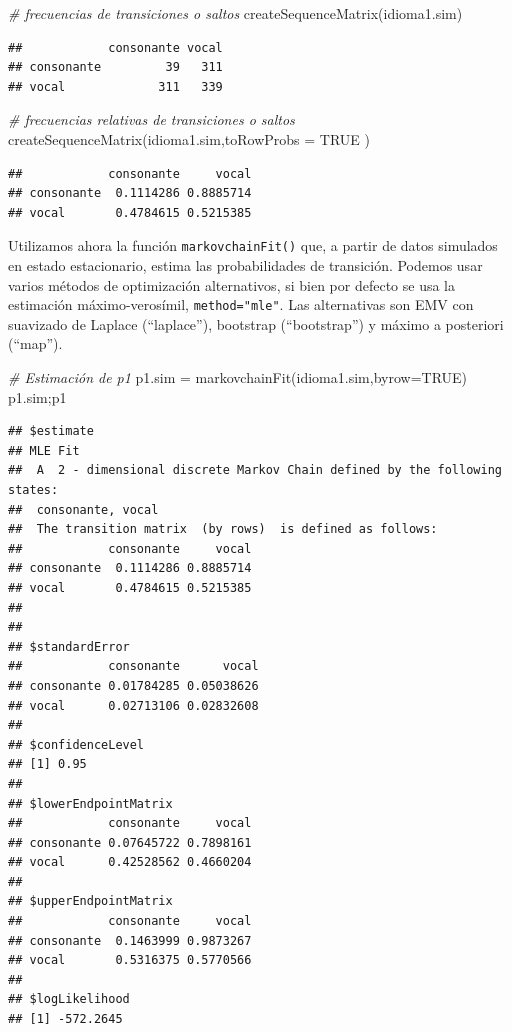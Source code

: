\documentclass[
]{book}
\newenvironment{Shaded}{\begin{snugshade}}{\end{snugshade}}
\newcommand{\AttributeTok}[1]{\textcolor[rgb]{0.77,0.63,0.00}{#1}}
\newcommand{\CommentTok}[1]{\textcolor[rgb]{0.56,0.35,0.01}{\textit{#1}}}
\newcommand{\ConstantTok}[1]{\textcolor[rgb]{0.00,0.00,0.00}{#1}}
\newcommand{\FunctionTok}[1]{\textcolor[rgb]{0.00,0.00,0.00}{#1}}
\newcommand{\NormalTok}[1]{#1}
\newcommand{\OtherTok}[1]{\textcolor[rgb]{0.56,0.35,0.01}{#1}}
\theoremstyle{definition}
\theoremstyle{definition}
\theoremstyle{definition}
\theoremstyle{definition}
\theoremstyle{remark}
\begin{document}
\begin{Shaded}
\begin{Highlighting}[]
\CommentTok{\# frecuencias de transiciones o saltos}
\FunctionTok{createSequenceMatrix}\NormalTok{(idioma1.sim)}
\end{Highlighting}
\end{Shaded}

\begin{verbatim}
##            consonante vocal
## consonante         39   311
## vocal             311   339
\end{verbatim}

\begin{Shaded}
\begin{Highlighting}[]
\CommentTok{\# frecuencias relativas de transiciones o saltos}
\FunctionTok{createSequenceMatrix}\NormalTok{(idioma1.sim,}\AttributeTok{toRowProbs =} \ConstantTok{TRUE}\NormalTok{ )}
\end{Highlighting}
\end{Shaded}

\begin{verbatim}
##            consonante     vocal
## consonante  0.1114286 0.8885714
## vocal       0.4784615 0.5215385
\end{verbatim}

Utilizamos ahora la función \texttt{markovchainFit()} que, a partir de datos simulados en estado estacionario, estima las probabilidades de transición. Podemos usar varios métodos de optimización alternativos, si bien por defecto se usa la estimación máximo-verosímil, \texttt{method="mle"}. Las alternativas son EMV con suavizado de Laplace (``laplace''), bootstrap (``bootstrap'') y máximo a posteriori (``map'').

\begin{Shaded}
\begin{Highlighting}[]
\CommentTok{\# Estimación de p1}
\NormalTok{p1.sim }\OtherTok{=} \FunctionTok{markovchainFit}\NormalTok{(idioma1.sim,}\AttributeTok{byrow=}\ConstantTok{TRUE}\NormalTok{)}
\NormalTok{p1.sim;p1}
\end{Highlighting}
\end{Shaded}

\begin{verbatim}
## $estimate
## MLE Fit 
##  A  2 - dimensional discrete Markov Chain defined by the following states: 
##  consonante, vocal 
##  The transition matrix  (by rows)  is defined as follows: 
##            consonante     vocal
## consonante  0.1114286 0.8885714
## vocal       0.4784615 0.5215385
## 
## 
## $standardError
##            consonante      vocal
## consonante 0.01784285 0.05038626
## vocal      0.02713106 0.02832608
## 
## $confidenceLevel
## [1] 0.95
## 
## $lowerEndpointMatrix
##            consonante     vocal
## consonante 0.07645722 0.7898161
## vocal      0.42528562 0.4660204
## 
## $upperEndpointMatrix
##            consonante     vocal
## consonante  0.1463999 0.9873267
## vocal       0.5316375 0.5770566
## 
## $logLikelihood
## [1] -572.2645
\end{verbatim}
\end{document}

